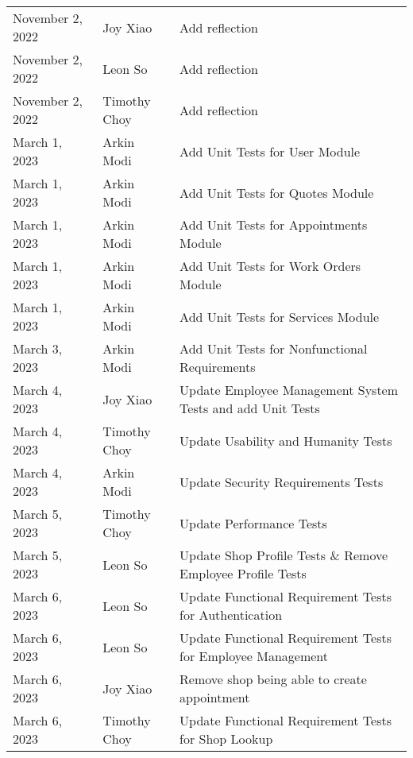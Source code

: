 \documentclass[12pt, titlepage]{article}
\begin{document}
\begin{longtable}{p{} p{} p{}}
	November 2, 2022 & Joy Xiao              & Add reflection                                              \\
	November 2, 2022 & Leon So               & Add reflection                                              \\
	November 2, 2022 & Timothy Choy          & Add reflection                                              \\
	March 1, 2023    & Arkin Modi            & Add Unit Tests for User Module                              \\
	March 1, 2023    & Arkin Modi            & Add Unit Tests for Quotes Module                            \\
	March 1, 2023    & Arkin Modi            & Add Unit Tests for Appointments Module                      \\
	March 1, 2023    & Arkin Modi            & Add Unit Tests for Work Orders Module                       \\
	March 1, 2023    & Arkin Modi            & Add Unit Tests for Services Module                          \\
	March 3, 2023    & Arkin Modi            & Add Unit Tests for Nonfunctional Requirements               \\
	March 4, 2023    & Joy Xiao              & Update Employee Management System Tests and add Unit Tests  \\
	March 4, 2023    & Timothy Choy          & Update Usability and Humanity Tests                         \\
	March 4, 2023    & Arkin Modi            & Update Security Requirements Tests                          \\
	March 5, 2023    & Timothy Choy          & Update Performance Tests                                    \\
	March 5, 2023    & Leon So               & Update Shop Profile Tests \& Remove Employee Profile Tests  \\
	March 6, 2023    & Leon So               & Update Functional Requirement Tests for Authentication      \\
	March 6, 2023    & Leon So               & Update Functional Requirement Tests for Employee Management \\
	March 6, 2023    & Joy Xiao              & Remove shop being able to create appointment                \\
	March 6, 2023    & Timothy Choy          & Update Functional Requirement Tests for Shop Lookup         \\
	\bottomrule
\end{longtable}
\end{document}
